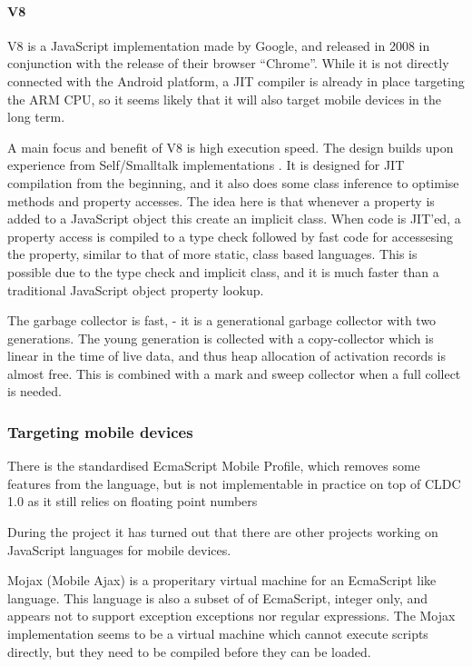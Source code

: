 \documentclass[11pt]{report}
\begin{document}
\paragraph{V8} V8 \cite{v8} is a JavaScript implementation made by Google, and released in 2008 in conjunction with the release of their browser ``Chrome''. 
While it is not directly connected with the Android platform, a JIT compiler is already in place targeting the ARM CPU, so it seems likely that it will also target mobile devices in the long term.

A main focus and benefit of V8 is high execution speed.
The design builds upon experience from Self/Smalltalk implementations \cite{articles-before-v8}.
It is designed for JIT compilation from the beginning, and it also does some class inference to optimise methods and property accesses.
The idea here is that whenever a property is added to a JavaScript object this create an implicit class. When code is JIT'ed, a property access is compiled to a type check followed by fast code for accessesing the property, similar to that of more static, class based languages. This is possible due to the type check and implicit class, and it is much faster than a traditional JavaScript object property lookup.

The garbage collector is fast, - it is a generational garbage collector with two generations. The young generation is collected with a copy-collector which is linear in the time of live data, and thus heap allocation of activation records is almost free. 
This is combined with a mark and sweep collector when a full collect is needed.

\subsubsection{Targeting mobile devices}

There is the standardised EcmaScript Mobile Profile, which removes some features from the language, but is not implementable in practice on top of CLDC 1.0 as it still relies on floating point numbers

During the project it has turned out that there are other projects working on JavaScript languages for mobile devices.

Mojax (Mobile Ajax) \cite{mojax} is a properitary virtual machine for an EcmaScript like language. This language is also a subset of of EcmaScript, integer only, and appears not to support exception exceptions nor regular expressions.
The Mojax implementation seems to be a virtual machine which cannot execute scripts directly, but they need to be compiled before they can be loaded.
\end{document}
